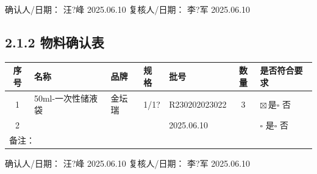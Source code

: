 \documentclass[UTF8,10pt,a4paper,fontset=fandol]{ctexart}
\newcommand{\fieldvalue}[1]{#1}
\newcommand{\handwritten}[1]{#1}
\begin{document}
\noindent
确认人/日期：
\fieldvalue{\handwritten{汪?峰}}
\quad
\fieldvalue{\handwritten{2025.06.10}}
\qquad
复核人/日期：
\fieldvalue{\handwritten{李?军}}
\quad
\fieldvalue{\handwritten{2025.06.10}}

\subsection*{2.1.2 物料确认表}

\small
\begin{tabularx}{\textwidth}{|c|X|X|X|X|c|X|}
\hline
序号 & 名称 & 品牌 & 规格 & 批号 & 数量 & 是否符合要求 \\
\hline
1 &
\fieldvalue{\handwritten{50ml-一次性储液袋}} &
\fieldvalue{\handwritten{金坛瑞}} &
\fieldvalue{\handwritten{1/1?}} &
\fieldvalue{\handwritten{R230202023022}} &
\fieldvalue{\handwritten{3}} &
\fieldvalue{\ensuremath{\boxtimes}\,是}\quad$\square$ 否 \\
\hline
2 & & & &
\fieldvalue{\handwritten{2025.06.10}} &
& $\square$ 是\quad$\square$ 否 \\
\hline
\multicolumn{7}{|l|}{备注：} \\
\hline
\end{tabularx}
\normalsize

\noindent
确认人/日期：
\fieldvalue{\handwritten{汪?峰}}
\quad
\fieldvalue{\handwritten{2025.06.10}}
\qquad
复核人/日期：
\fieldvalue{\handwritten{李?军}}
\quad
\fieldvalue{\handwritten{2025.06.10}}
\end{document}
